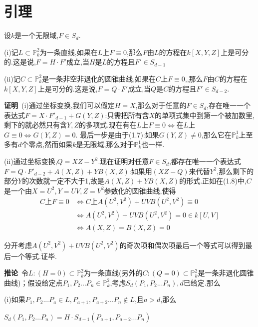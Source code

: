 \documentclass[UTF8]{book}
\begin{document}
	\section{引理}
		设$ k $是一个无限域,$F \in S_{d}$.
		
		
		(i)记$L\subset \mathbb{P}^{2}_{k}$为一条直线,如果在$ L $上$F\equiv 0$,那么$ F $由$ L $的方程在$ k[X,Y,Z] $上是可分的.这是说,$ F=H·F' $成立,当$ H $是$ L $的方程且$F'\in S_{d-1}$
		
		
		(ii)记$C\subset \mathbb{P}^{2}_{k}$是一条非空非退化的圆锥曲线,如果在$ C $上$ F \equiv 0 $,,那么$ F $由$ C $的方程在$ k[X,Y,Z] $上是可分的.这是说,$ F=Q·F' $成立,当$ Q $是$ C $的方程且$F' \in S_{d-2}$.
		
		
		\textbf{证明}\ (i)通过坐标变换,我们可以假定$ H=X $,那么对于任意的$F \in S_{d}$,存在唯一一个表达式$F=X· F'_{d-1} +G(Y,Z)$:只需把所有含$ X $的单项式集中到第一个被加数里,剩下的就必然只有含$ Y,Z $的多项式.现在有在$ L $上$F \equiv 0 \Leftrightarrow$在$ L $上$G \equiv 0\Leftrightarrow G(Y,Z)=0$. 最后一步是由于(1.7):如果$ G(Y,Z) \ne 0 $,那么它在$\mathbb{P}^{1}_{k}$上至多有$ d $个零点,然而如果$ k $是无限域,那么对于$\mathbb{P}^{1}_{k}$也一样.
		
		
		(ii)通过坐标变换,$Q=XZ-Y^{2}$.现在证明对任意$F\in S_{d}$,都存在唯一一个表达式$ F=Q·F'_{d-2}+A(X,Z)+YB(X,Z) $:如果用$ (XZ-Q) $来代替$Y^{2}$,那么剩下的部分$ Y $的次数就一定不大于1,故是$ A(X,Z)+YB(X,Z) $的形式.正如在(1.8)中,$ C $是一个由$X=U^{2},Y=UV,Z=V^{2}$参数化的圆锥曲线,使得
		\begin{equation*}
		\begin{split}
		C\text{上}F\equiv0&\Leftrightarrow C\text{上}A(U^{2},V^{2})+UVB(U^{2},V^{2})\equiv0\\
		&\Leftrightarrow A(U^{2},V^{2})+UVB(U^{2},V^{2})=0\in k[U,V]\\
		&\Leftrightarrow A(X,Z)=B(X,Z)=0
		\end{split}
		\end{equation*}
		
		分开考虑$ A(U^{2},V^{2})+UVB(U^{2},V^{2}) $的奇次项和偶次项最后一个等式可以得到最后一个等式.证毕.
		
		\textbf{推论}\ 令$L:(H=0)\subset \mathbb{P}^{2}_{k}$为一条直线(另外的$C:(Q=0) \subset \mathbb{P}^{2}_{k}$是一条非退化圆锥曲线)；假设给定点$P_{1},P_{2} ... P_{n} \in \mathbb{P}^{2}_{k}$,考虑$S_{d}(P_{1},P_{2} ... P_{n}),d$已给定.那么
		
		(i)如果$P_{1},P_{2} ... P_{a} \in L, P_{a+1},P_{a+2} ... P_{n} \notin L$,且$ a>d $,那么
		
		
		\quad $S_{d}(P_{1},P_{2} ... P_{n} )=H·S_{d-1}(P_{a+1},P_{a+2} ... P_{n})$
		
\end{document}
